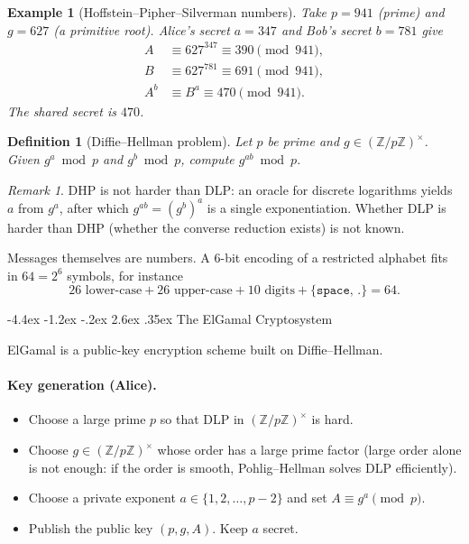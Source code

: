 \documentclass[11pt]{article}
\makeatletter
\renewcommand{\section}{\@startsection{section}{1}{\z@}%
    {-4.4ex \@plus -1.2ex \@minus -.2ex}%
    {2.6ex \@plus .35ex}%
    {\normalfont\Large\bfseries}}
\newtheorem{definition}[theorem]{Definition}
\newtheorem{example}[theorem]{Example}
\theoremstyle{remark}
\newtheorem*{remark}{Remark}
\newcommand{\units}[1]{\left(\mathbb Z/#1\mathbb Z\right)^\times}
\makeatother
\begin{document}
\begin{example}[Hoffstein--Pipher--Silverman numbers]
Take $p=941$ (prime) and $g=627$ (a primitive root). Alice's secret
$a=347$ and Bob's secret $b=781$ give
\begin{align*}
    A &\equiv 627^{347} \equiv 390 \pmod{941},\\
    B &\equiv 627^{781} \equiv 691 \pmod{941},\\
    A^b &\equiv B^a \equiv 470 \pmod{941}.
\end{align*}
The shared secret is $470$.
\end{example}

\begin{definition}[Diffie--Hellman problem]
Let $p$ be prime and $g\in\units{p}$. Given $g^a\bmod p$ and
$g^b\bmod p$, compute $g^{ab}\bmod p$.
\end{definition}

\begin{remark}
DHP is not harder than DLP: an oracle for discrete logarithms yields
$a$ from $g^a$, after which $g^{ab}=(g^b)^a$ is a single
exponentiation. Whether DLP is harder than DHP (whether the converse
reduction exists) is not known.
\end{remark}

Messages themselves are numbers. A $6$-bit encoding of a restricted
alphabet fits in $64=2^6$ symbols, for instance
\[
    26\text{ lower-case}+26\text{ upper-case}+10\text{ digits}
    +\{\texttt{space},\,\texttt{.}\}
    =64.
\]

\section{The ElGamal Cryptosystem}

ElGamal is a public-key encryption scheme built on Diffie--Hellman.

\paragraph{Key generation (Alice).}
\begin{itemize}[leftmargin=1.4em]
    \item Choose a large prime $p$ so that DLP in $\units{p}$ is hard.
    \item Choose $g\in\units{p}$ whose order has a large prime factor
    (large order alone is not enough: if the order is smooth, Pohlig--Hellman
    solves DLP efficiently).
    \item Choose a private exponent $a\in\{1,2,\ldots,p-2\}$ and set
    $A\equiv g^a\pmod{p}$.
    \item Publish the public key $(p,g,A)$. Keep $a$ secret.
\end{itemize}
\end{document}
